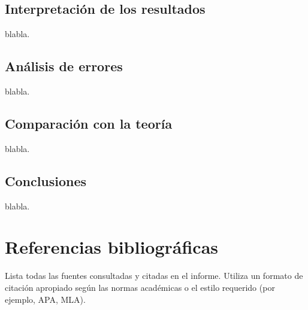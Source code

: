 \documentclass[twocolumn,12pt]{article}
\begin{document}
	\subsection{Interpretación de los resultados}
	blabla.
	
	\subsection{Análisis de errores}
	blabla.
	
	\subsection{Comparación con la teoría}
	blabla.
	
	\subsection{Conclusiones}
	blabla.
	
	
	\section{Referencias bibliográficas}
	Lista todas las fuentes consultadas y citadas en el informe. Utiliza un formato de citación apropiado según las normas académicas o el estilo requerido (por ejemplo, APA, MLA).
\end{document}
